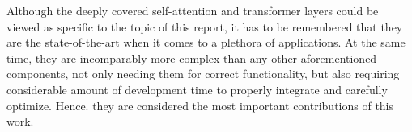 Although the deeply covered self-attention and transformer layers could be viewed as specific to the topic of this report, it has to be remembered that they are the state-of-the-art when it comes to a plethora of applications. At the same time, they are incomparably more complex than any other aforementioned components, not only needing them for correct functionality, but also requiring considerable amount of development time to properly integrate and carefully optimize. Hence. they are considered the most important \hlsml contributions of this work.